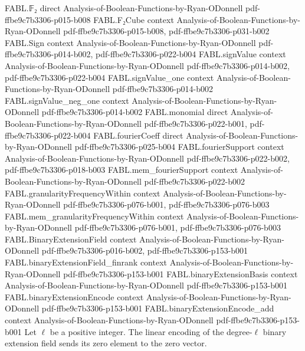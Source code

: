 \begin{theorem}
\label{FABL.binaryExtensionEncode_zero}
\leanok
{}
\proofstep
  {FABL.𝔽₂}
  {direct}
  {Analysis-of-Boolean-Functions-by-Ryan-ODonnell}
  {pdf-ffbe9c7b3306-p015-b008}
\proofstep
  {FABL.F₂Cube}
  {context}
  {Analysis-of-Boolean-Functions-by-Ryan-ODonnell}
  {pdf-ffbe9c7b3306-p015-b008,
    pdf-ffbe9c7b3306-p031-b002}
\proofstep
  {FABL.Sign}
  {context}
  {Analysis-of-Boolean-Functions-by-Ryan-ODonnell}
  {pdf-ffbe9c7b3306-p014-b002,
    pdf-ffbe9c7b3306-p022-b004}
\proofstep
  {FABL.signValue}
  {context}
  {Analysis-of-Boolean-Functions-by-Ryan-ODonnell}
  {pdf-ffbe9c7b3306-p014-b002,
    pdf-ffbe9c7b3306-p022-b004}
\proofstep
  {FABL.signValue_one}
  {context}
  {Analysis-of-Boolean-Functions-by-Ryan-ODonnell}
  {pdf-ffbe9c7b3306-p014-b002}
\proofstep
  {FABL.signValue_neg_one}
  {context}
  {Analysis-of-Boolean-Functions-by-Ryan-ODonnell}
  {pdf-ffbe9c7b3306-p014-b002}
\proofstep
  {FABL.monomial}
  {direct}
  {Analysis-of-Boolean-Functions-by-Ryan-ODonnell}
  {pdf-ffbe9c7b3306-p022-b001,
    pdf-ffbe9c7b3306-p022-b004}
\proofstep
  {FABL.fourierCoeff}
  {direct}
  {Analysis-of-Boolean-Functions-by-Ryan-ODonnell}
  {pdf-ffbe9c7b3306-p025-b004}
\proofstep
  {FABL.fourierSupport}
  {context}
  {Analysis-of-Boolean-Functions-by-Ryan-ODonnell}
  {pdf-ffbe9c7b3306-p022-b002,
    pdf-ffbe9c7b3306-p018-b003}
\proofstep
  {FABL.mem_fourierSupport}
  {context}
  {Analysis-of-Boolean-Functions-by-Ryan-ODonnell}
  {pdf-ffbe9c7b3306-p022-b002}
\proofstep
  {FABL.granularityFrequencyWithin}
  {context}
  {Analysis-of-Boolean-Functions-by-Ryan-ODonnell}
  {pdf-ffbe9c7b3306-p076-b001,
    pdf-ffbe9c7b3306-p076-b003}
\proofstep
  {FABL.mem_granularityFrequencyWithin}
  {context}
  {Analysis-of-Boolean-Functions-by-Ryan-ODonnell}
  {pdf-ffbe9c7b3306-p076-b001,
    pdf-ffbe9c7b3306-p076-b003}
\proofstep
  {FABL.BinaryExtensionField}
  {context}
  {Analysis-of-Boolean-Functions-by-Ryan-ODonnell}
  {pdf-ffbe9c7b3306-p016-b002,
    pdf-ffbe9c7b3306-p153-b001}
\proofstep
  {FABL.binaryExtensionField_finrank}
  {context}
  {Analysis-of-Boolean-Functions-by-Ryan-ODonnell}
  {pdf-ffbe9c7b3306-p153-b001}
\proofstep
  {FABL.binaryExtensionBasis}
  {context}
  {Analysis-of-Boolean-Functions-by-Ryan-ODonnell}
  {pdf-ffbe9c7b3306-p153-b001}
\proofstep
  {FABL.binaryExtensionEncode}
  {context}
  {Analysis-of-Boolean-Functions-by-Ryan-ODonnell}
  {pdf-ffbe9c7b3306-p153-b001}
\proofstep
  {FABL.binaryExtensionEncode_add}
  {context}
  {Analysis-of-Boolean-Functions-by-Ryan-ODonnell}
  {pdf-ffbe9c7b3306-p153-b001}
Let $\ell$ be a positive integer. The linear encoding of the degree-$\ell$ binary
extension field sends its zero element to the zero vector.
\end{theorem}

